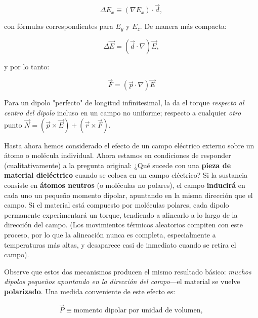 \documentclass[12pt,a4paper]{report}
\newcommand{\esp}{\vspace{0.5cm}}
\begin{document}
	\begin{equation*}
		\Delta E_x \equiv (\nabla E_x) \cdot \vec{d},
	\end{equation*}
	
	\noindent con fórmulas correspondientes para $E_y$ y $E_z$. De manera más compacta:
	
	\begin{equation*}
		\Delta \vec{E} = (\vec{d} \cdot \nabla) \vec{E},
	\end{equation*}
	
	\noindent y por lo tanto:
	
	\begin{equation}
		\vec{F} = (\vec{p} \cdot \nabla) \vec{E}
	\end{equation}
	
	Para un dipolo "perfecto" de longitud infinitesimal, la da el torque \textit{respecto al centro del dipolo} incluso en un campo no uniforme; respecto a cualquier \textit{otro} punto $\vec{N} = (\vec{p} \times \vec{E}) + (\vec{r} \times \vec{F})$.
	
	\esp
	
	\noindent Hasta ahora hemos considerado el efecto de un campo eléctrico externo sobre un átomo o molécula individual. Ahora estamos en condiciones de responder (cualitativamente) a la pregunta original: ¿Qué sucede con una \textbf{pieza de material dieléctrico} cuando se coloca en un campo eléctrico? Si la sustancia consiste en \textbf{átomos neutros} (o moléculas no polares), el campo \textbf{inducirá} en cada uno un pequeño momento dipolar, apuntando en la misma dirección que el campo. Si el material está compuesto por moléculas polares, cada dipolo permanente experimentará un torque, tendiendo a alinearlo a lo largo de la dirección del campo. (Los movimientos térmicos aleatorios compiten con este proceso, por lo que la alineación nunca es completa, especialmente a temperaturas más altas, y desaparece casi de inmediato cuando se retira el campo).
	
	\esp
	
	Observe que estos dos mecanismos producen el mismo resultado básico: \textit{muchos dipolos pequeños apuntando en la dirección del campo}—el material se vuelve \textbf{polarizado}. Una medida conveniente de este efecto es:
	
	\begin{equation*}
		\vec{P} \equiv \text{momento dipolar por unidad de volumen},
	\end{equation*}
	
\end{document}
